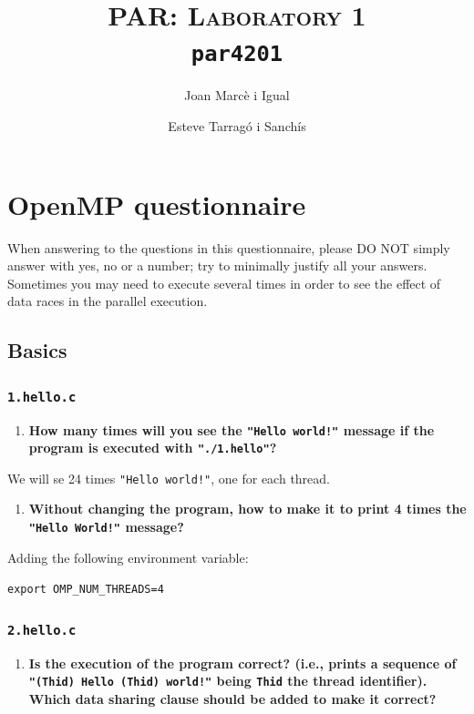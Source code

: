 \documentclass[a4paper]{article}
\title{
	\textsc{PAR: Laboratory 1} \\
	\texttt{\large par4201}
}
\author{Joan Marcè i Igual \and Esteve Tarragó i Sanchís}
\begin{document}
\maketitle
\tableofcontents
\pagebreak

\section{OpenMP questionnaire}

When answering to the questions in this questionnaire, please DO NOT simply answer with yes, no or a number; try to minimally justify all your answers. Sometimes you may need to execute several times in order to see the effect of data races in the parallel execution.

\subsection{Basics}

\subsubsection{\texttt{1.hello.c}}

\begin{enumerate}
	\item \textbf{How many times will you see the \texttt{"Hello world!"} message if the program is executed with \texttt{"./1.hello"}?}
\end{enumerate}

We will se 24 times \texttt{"Hello world!"}, one for each thread.

\begin{enumerate}[resume]
	\item \textbf{Without changing the program, how to make it to print 4 times the \texttt{"Hello World!"} message?}
\end{enumerate}

Adding the following environment variable:

\verb|export OMP_NUM_THREADS=4|

\subsubsection{\texttt{2.hello.c}}

\begin{enumerate}
	\item \textbf{Is the execution of the program correct? (i.e., prints a sequence of \texttt{"(Thid) Hello (Thid) world!"} being \texttt{Thid} the thread identifier). Which data sharing clause should be added to make it correct?}
\end{enumerate}
\end{document}
